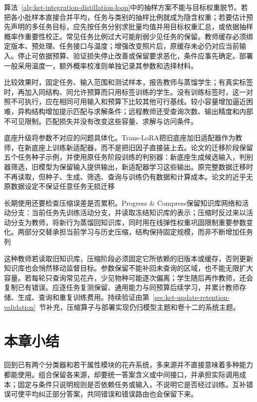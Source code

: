 算法~\ref{alg:ket-integration-distillation-loop}中的抽样方案不能与目标权重脱节。若把各小批样本直接合并平均，任务与类别的抽样比例就成为隐含权重；若要估计预先声明的多任务目标，应先按任务分别求批量均值并用目标权重汇总，或依据抽样概率作重要性校正。常见任务比例过大可能削弱少见任务的保留。教师缓存必须绑定版本、预处理、任务接口与温度；增强改变照片后，原缓存未必仍对应当前输入。停止可依据预算、验证损失停止改善或保留要求恶化，条件应事先确定。部署一般采用温度一，额外概率校准则单独记录其参数和选择材料。

比较效果时，固定任务、输入范围和测试样本，报告教师与蒸馏学生；有真实标签时，再加入同结构、同允许预算而只用标签训练的学生。没有训练标签时，这一对照不可执行，应在相同可用输入和预算下比较其他可行基线。较小容量增加逼近困难，异构结构增加提示匹配与求解条件；远程教师还受查询次数、输出精度和内部不可见限制。匹配损失并没有改变这些容量、求解与访问条件。

底座升级将参数不对应的问题具体化。Trans-LoRA把旧底座加旧适配器作为教师，在新底座上训练新适配器，而不是把旧因子直接装上去。论文的迁移阶段保留五个任务种子示例，并使用原任务阶段训练的判别器：新底座生成候选输入，判别器筛选，旧模型为保留输入提供输出，新适配器学习这些输出。原完整数据迁移时不再读取，但种子、生成、筛选、查询与训练仍有数据和计算成本。论文的近乎无原数据设定不保证任意任务无损迁移

长期使用还要检查压缩误差是否累积。Progress \& Compress保留知识库网络和活动分支：当前任务先训练活动分支，并读取冻结知识库的表示；压缩时反过来以活动分支为教师，将新行为蒸馏回知识库，同时用在线弹性权重巩固限制重要参数变化。两部分交替承担当前学习与历史压缩，结构保持固定规模，而非不断增加任务列

这种教师若读取旧知识库，压缩阶段必须固定它所依赖的旧版本或缓存，否则更新知识库也会悄然移动监督目标。参数保留不能补回未查询的区域，也不能无限扩大容量。若每轮只查询常见花卉，少见物种可能逐次偏离；学生随后再作教师，还会复制已有错误。应逐任务复测保留、通用能力与同预算后续学习，并累计教师存储、生成、查询和重复训练费用。持续验证由第~\ref{sec:ket-update-retention-validation}~节补充，压缩算子与部署实现仍归模型主题和卷十二的系统主题。

\section{本章小结}
\label{sec:ket-integration-summary}

回到已有两个分类器和若干属性模块的花卉系统，多来源并不直接意味着多种能力都能使用。组合保留各来源，却要统一答案含义或中间接口，并承担实际调用成本；固定与条件只说明规则是否依赖任务或输入，不说明它是否经过训练。互补错误可使平均纠正部分答案，共同错误和错误路由也会保留下来。

